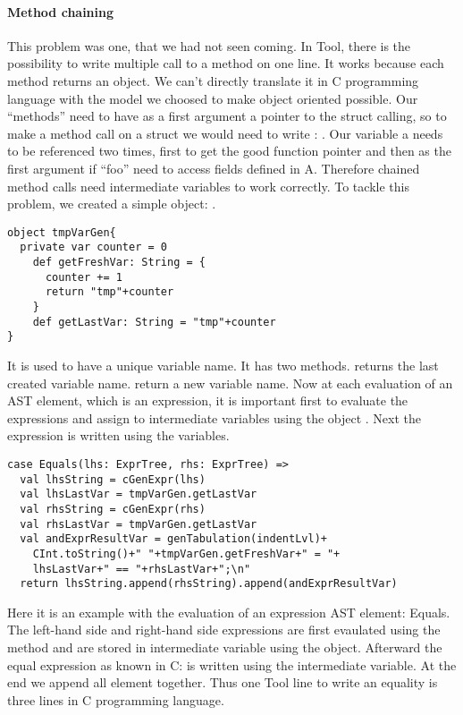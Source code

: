 \paragraph{Method chaining}
\break
This problem was one, that we had not seen coming.
\newline
In Tool, there is the possibility to write multiple call to a method on one line.
It works because each method returns an object. We can't directly translate it in C programming language with the model we choosed to make object oriented possible. Our ``methods'' need to have as a first argument a pointer to the struct calling, so to make a method call on a struct we would need to write : \lstset{style=customc}{\lstinline[basicstyle=\small\ttfamily]|void * a = new(nA); ((struct A *) a)->foo(a)|}. Our variable a needs to be referenced two times, first to get the good function pointer and then as the first argument if ``foo'' need to access fields defined in A. Therefore chained method calls need intermediate variables to work correctly. 
To tackle this problem, we created a simple object: .
\lstset{style=customscala}
\begin{lstlisting}
object tmpVarGen{
  private var counter = 0
    def getFreshVar: String = {
      counter += 1
      return "tmp"+counter
    }
    def getLastVar: String = "tmp"+counter
}
\end{lstlisting}
It is used to have a unique variable name. It has two methods.
 returns the last created variable name.
 return a new variable name.
\newline
Now at each evaluation of an AST element, which is an expression, it is important first to evaluate the expressions
and assign to intermediate variables using the object . Next the expression is written using
the variables.
\begin{lstlisting}
case Equals(lhs: ExprTree, rhs: ExprTree) =>
  val lhsString = cGenExpr(lhs)
  val lhsLastVar = tmpVarGen.getLastVar
  val rhsString = cGenExpr(rhs)
  val rhsLastVar = tmpVarGen.getLastVar
  val andExprResultVar = genTabulation(indentLvl)+
    CInt.toString()+" "+tmpVarGen.getFreshVar+" = "+
    lhsLastVar+" == "+rhsLastVar+";\n"
  return lhsString.append(rhsString).append(andExprResultVar)
\end{lstlisting}
Here it is an example with the evaluation of an expression AST element: Equals.
The left-hand side and right-hand side expressions are first evaulated using the  method and
are stored in intermediate variable using the  object.
Afterward the equal expression as known in C:  is written using the intermediate variable.
At the end we append all element together. Thus one Tool line to write an equality is
three lines in C programming language.
\newline

